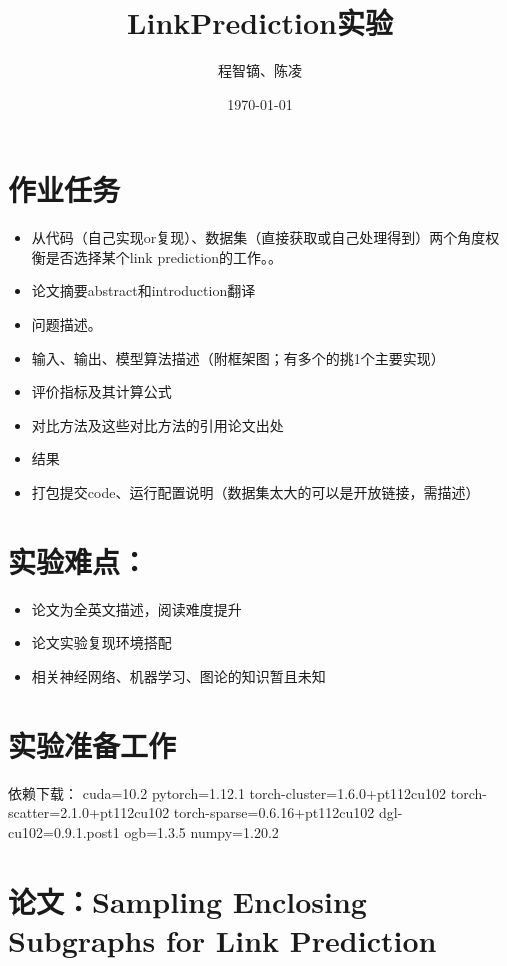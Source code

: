 \documentclass{article}
\title{LinkPrediction实验}
\author{程智镝、陈凌}
\date{\today}
\begin{document}
\maketitle

\section*{作业任务}
\begin{itemize}
    \item 从代码（自己实现or复现）、数据集（直接获取或自己处理得到）两个角度权衡是否选择某个link prediction的工作。。
    \item 论文摘要abstract和introduction翻译
    \item 问题描述。
    \item 输入、输出、模型算法描述（附框架图；有多个的挑1个主要实现）
    \item 评价指标及其计算公式
    \item 对比方法及这些对比方法的引用论文出处
    \item 结果
    \item 打包提交code、运行配置说明（数据集太大的可以是开放链接，需描述）
\end{itemize}
\section*{实验难点：}
\begin{itemize}
    \item 论文为全英文描述，阅读难度提升
    \item 论文实验复现环境搭配
    \item 相关神经网络、机器学习、图论的知识暂且未知
\end{itemize}
\section*{实验准备工作}
依赖下载：
cuda=10.2
pytorch=1.12.1
torch-cluster=1.6.0+pt112cu102
torch-scatter=2.1.0+pt112cu102
torch-sparse=0.6.16+pt112cu102
dgl-cu102=0.9.1.post1
ogb=1.3.5
numpy=1.20.2
\section*{论文：Sampling Enclosing Subgraphs for Link Prediction}
\end{document}

